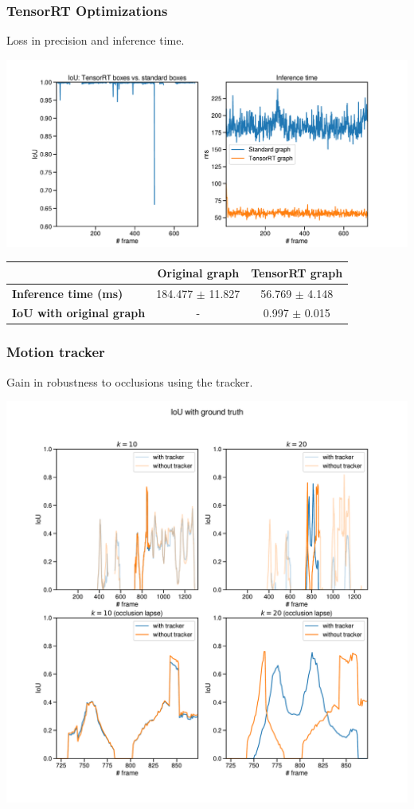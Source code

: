 \documentclass[11pt]{beamer}
\begin{document}
\begin{frame}
	\frametitle{TensorRT Optimizations}
	Loss in precision and inference time.
	\begin{center}
		\includegraphics[width=0.9\linewidth]{test3}
	\end{center}
	
	\begin{table}[h]
		\tiny
		\begin{tabular}{|l|c|c|}
			\hline
			& \textbf{Original graph} & \textbf{TensorRT graph} \\ \hline
			\textbf{Inference time (ms)}           & 184.477 $\pm$  11.827 & 56.769 $\pm$  4.148 \\ \hline
			\textbf{IoU with original graph}           & - & 0.997 $\pm$  0.015 \\ \hline
		\end{tabular}
	\end{table}
\end{frame}

\begin{frame}
	\frametitle{Motion tracker}
	Gain in robustness to occlusions using the tracker.
	\begin{center}
		\includegraphics[width=0.75\linewidth]{test5}
	\end{center}
\end{frame}
\end{document}
